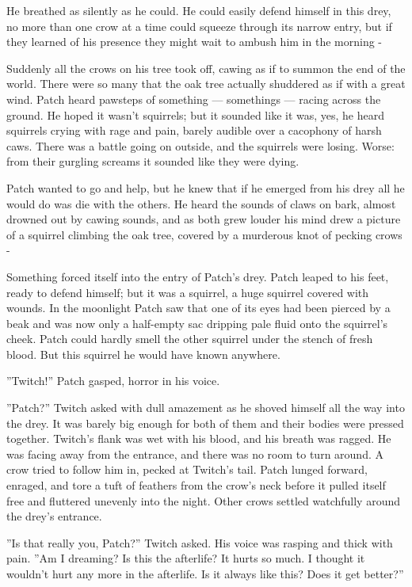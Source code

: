 \documentclass[12pt]{book}
\begin{document}
He breathed as silently as he could. He could easily defend himself in
this drey, no more than one crow at a time could squeeze through its
narrow entry, but if they learned of his presence they might wait to
ambush him in the morning -

Suddenly all the crows on his tree took off, cawing as if to summon
the end of the world. There were so many that the oak tree actually
shuddered as if with a great wind. Patch heard pawsteps of something
--- somethings --- racing across the ground. He hoped it wasn't
squirrels; but it sounded like it was, yes, he heard squirrels crying
with rage and pain, barely audible over a cacophony of harsh
caws. There was a battle going on outside, and the squirrels were
losing. Worse: from their gurgling screams it sounded like they were
dying.

Patch wanted to go and help, but he knew that if he emerged from his
drey all he would do was die with the others. He heard the sounds of
claws on bark, almost drowned out by cawing sounds, and as both grew
louder his mind drew a picture of a squirrel climbing the oak tree,
covered by a murderous knot of pecking crows -

Something forced itself into the entry of Patch's drey. Patch leaped
to his feet, ready to defend himself; but it was a squirrel, a huge
squirrel covered with wounds. In the moonlight Patch saw that one of
its eyes had been pierced by a beak and was now only a half-empty sac
dripping pale fluid onto the squirrel's cheek. Patch could hardly
smell the other squirrel under the stench of fresh blood. But this
squirrel he would have known anywhere.

''Twitch!'' Patch gasped, horror in his voice.

''Patch?'' Twitch asked with dull amazement as he shoved himself all
the way into the drey. It was barely big enough for both of them and
their bodies were pressed together. Twitch's flank was wet with his
blood, and his breath was ragged. He was facing away from the
entrance, and there was no room to turn around. A crow tried to follow
him in, pecked at Twitch's tail. Patch lunged forward, enraged, and
tore a tuft of feathers from the crow's neck before it pulled itself
free and fluttered unevenly into the night. Other crows settled
watchfully around the drey's entrance.

''Is that really you, Patch?'' Twitch asked. His voice was rasping and
thick with pain. ''Am I dreaming? Is this the afterlife? It hurts so
much. I thought it wouldn't hurt any more in the afterlife. Is it
always like this? Does it get better?''
\end{document}

